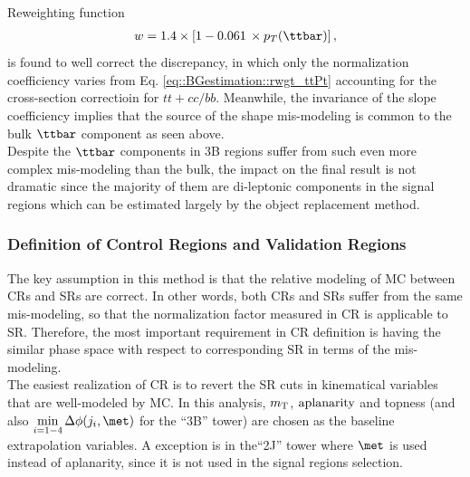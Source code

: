 Reweighting function
\begin{align}
w = 1.4 \times \left[ 1 - 0.061 \,\times p_T(\ttbar) \right] \label{eq::BGestimation::rwgt_ttPt3B},
\end{align}
is found to well correct the discrepancy, in which only the normalization coefficiency varies from Eq. \ref{eq::BGestimation::rwgt_ttPt} accounting for the cross-section correctioin for $tt+cc/bb$. Meanwhile, the invariance of the slope coefficiency implies that the source of the shape mis-modeling is common to the bulk $\ttbar$ component as seen above. \\

Despite the $\ttbar$ components in 3B regions suffer from such even more complex mis-modeling than the bulk, the impact on the final result is not dramatic since the majority of them are di-leptonic components in the signal regions which can be estimated largely by the object replacement method.




\clearpage


%
%


\subsubsection{Definition of Control Regions and Validation Regions} \label{sec::BGestimation::CRdef}
The key assumption in this method is that the relative modeling of MC between CRs and SRs are correct. In other words, both CRs and SRs suffer from the same mis-modeling, so that the normalization factor measured in CR is applicable to SR. Therefore, the most important requirement in CR definition is having the similar phase space with respect to corresponding SR in terms of the mis-modeling. \\

The easiest realization of CR is to revert the SR cuts in kinematical variables that are well-modeled by MC. In this analysis, $m_{\mathrm{T}}$, $\mathrm{aplanarity}$ and topness (and also $\mindPhiFourJet$ for the ``3B'' tower) are chosen as the baseline extrapolation variables. 
A exception is in the``2J'' tower where $\met$ is used instead of aplanarity, since it is not used in the signal regions selection.

